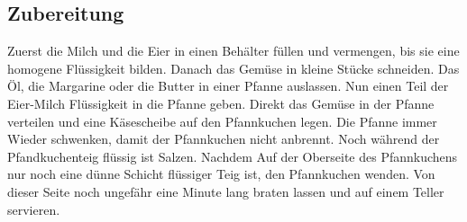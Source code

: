 \documentclass[12pt,a4paper,titlepage,parskip]{scrartcl}
\begin{document}
	\subsection{Zubereitung}
	Zuerst die Milch und die Eier in einen Behälter füllen und vermengen, bis sie eine homogene Flüssigkeit bilden. Danach das Gemüse in kleine Stücke schneiden. Das Öl, die Margarine oder die Butter in einer Pfanne auslassen. Nun einen Teil der Eier-Milch Flüssigkeit in die Pfanne geben. Direkt das Gemüse in der Pfanne verteilen und eine Käsescheibe auf den Pfannkuchen legen. Die Pfanne immer Wieder schwenken, damit der Pfannkuchen nicht anbrennt. Noch während der Pfandkuchenteig flüssig ist Salzen. Nachdem Auf der Oberseite des Pfannkuchens nur noch eine dünne Schicht flüssiger Teig ist, den Pfannkuchen wenden. Von dieser Seite noch ungefähr eine Minute lang braten lassen und auf einem Teller servieren.
\end{document}
